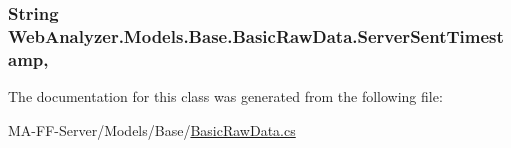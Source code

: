 \subsubsection[{Server\+Sent\+Timestamp}]{\setlength{\rightskip}{0pt plus 5cm}String Web\+Analyzer.\+Models.\+Base.\+Basic\+Raw\+Data.\+Server\+Sent\+Timestamp\hspace{0.3cm}{\ttfamily [get]}, {\ttfamily [set]}}\label{class_web_analyzer_1_1_models_1_1_base_1_1_basic_raw_data_a21d2fe8ffde6c6af33eef4e81922eecf}


The documentation for this class was generated from the following file\+:\begin{DoxyCompactItemize}
\item 
M\+A-\/\+F\+F-\/\+Server/\+Models/\+Base/\hyperlink{_basic_raw_data_8cs}{Basic\+Raw\+Data.\+cs}\end{DoxyCompactItemize}
